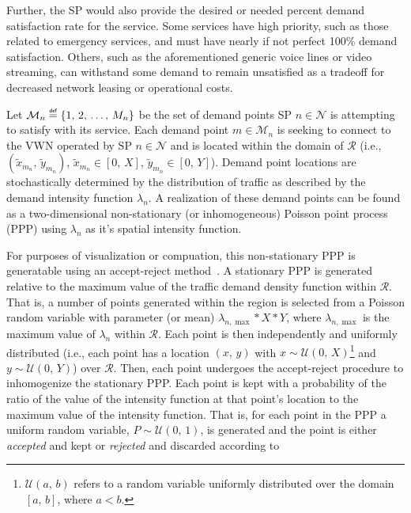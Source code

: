 \documentclass[12pt,dvipsnames]{report}
\newcommand\defeq{\mathrel{\overset{\makebox[0pt]{\mbox{\normalfont\tiny\sffamily def}}}{=}}}
\begin{document}
Further, the SP would also provide the desired or needed percent demand satisfaction rate for the service.  Some services have high priority, such as those related to emergency services, and must have nearly if not perfect 100\% demand satisfaction.  Others, such as the aforementioned generic voice lines or video streaming, can withstand some demand to remain unsatisfied as a tradeoff for decreased network leasing or operational costs.

Let $\mathcal{M}_n \defeq \left\{1,\, 2,\, \ldots,\, M_n\right\}$ be the set of demand points SP $n \in \mathcal{N}$ is attempting to satisfy with its service.  Each demand point $m \in \mathcal{M}_n$ is seeking to connect to the VWN operated by SP $n \in \mathcal{N}$ and is located within the domain of $\mathcal{R}$ (i.e., $\left( \tilde{x}_{m_n},\, \tilde{y}_{m_n} \right),\, \tilde{x}_{m_n} \in \left[ 0,\, X \right],\, \tilde{y}_{m_n} \in \left[ 0,\, Y \right]$).  Demand point locations are stochastically determined by the distribution of traffic as described by the demand intensity function $\lambda_n$.  A realization of these demand points can be found as a two-dimensional non-stationary (or inhomogeneous) Poisson point process (PPP) using $\lambda_n$ as it's spatial intensity function.

For purposes of visualization or compuation, this non-stationary PPP is generatable using an accept-reject method~\cite{leeds:nsPPPgeneration}.  A stationary PPP is generated relative to the maximum value of the traffic demand density function within $\mathcal{R}$.  That is, a number of points generated within the region is selected from a Poisson random variable with parameter (or mean) $\lambda_{n,\max}*X*Y$, where $\lambda_{n,\max}$ is the maximum value of $\lambda_n$ within $\mathcal{R}$.  Each point is then independently and uniformly distributed (i.e., each point has a location $\left( x,\, y \right)$ with $x \sim \mathcal{U}\left( 0,\, X \right)$\footnote{$\mathcal{U}\left( a,\, b \right)$ refers to a random variable uniformly distributed over the domain $\left[ a,\, b \right]$, where $a < b$.} and $y \sim \mathcal{U}\left( 0,\, Y \right)$) over $\mathcal{R}$.  Then, each point undergoes the accept-reject procedure to inhomogenize the stationary PPP.  Each point is kept with a probability of the ratio of the value of the intensity function at that point's location to the maximum value of the intensity function.  That is, for each point in the PPP a uniform random variable, $P \sim \mathcal{U}\left( 0,\, 1 \right)$, is generated and the point is either \emph{accepted} and kept or \emph{rejected} and discarded according to
\end{document}
